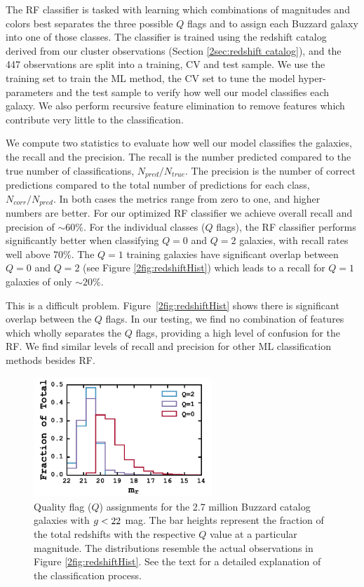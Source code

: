 The RF classifier is tasked with learning which combinations of magnitudes and colors best separates the three possible $Q$ flags and to assign each Buzzard galaxy into one of those classes. The classifier is trained using the redshift catalog derived from our cluster observations (Section \ref{2sec:redshift catalog}), and the 447 observations are split into a training, CV and test sample. We use the training set to train the ML method, the CV set to tune the model hyper-parameters and the test sample to verify how well our model classifies each galaxy. We also perform recursive feature elimination to remove features which contribute very little to the classification.

We compute two statistics to evaluate how well our model classifies the galaxies, the recall and the precision. The recall is the number predicted compared to the true number of classifications, $N_{pred}/N_{true}$. The precision is the number of correct predictions compared to the total number of predictions for each class, $N_{corr}/N_{pred}$. In both cases the metrics range from zero to one, and higher numbers are better. For our optimized RF classifier we achieve overall recall and precision of $\sim60\%$. For the individual classes ($Q$ flags), the RF classifier performs significantly better when classifying $Q=0$ and $Q=2$ galaxies, with recall rates well above 70\%. The $Q=1$ training galaxies have significant overlap between $Q=0$ and $Q=2$ (see Figure \ref{2fig:redshiftHist}) which leads to a recall for $Q=1$ galaxies of only $\sim20\%$. 

This is a difficult problem. Figure~\ref{2fig:redshiftHist} shows there is significant overlap between the $Q$ flags. In our testing, we find no combination of features which wholly separates the $Q$ flags, providing a high level of confusion for the RF. We find similar levels of recall and precision for other ML classification methods besides RF.

\begin{figure}[t]
	\includegraphics[width=0.6\textwidth]{figures2/buzzardQHist.pdf} 
	\caption{Quality flag ($Q$) assignments for the 2.7 million Buzzard catalog galaxies with $\hbox{$g$}< 22$ mag. The bar heights represent the fraction of the total redshifts with the respective $Q$ value at a particular magnitude. The distributions resemble the actual observations in Figure \ref{2fig:redshiftHist}. See the text for a detailed explanation of the classification process.} \label{2fig:buzzardHist} 
\end{figure}

